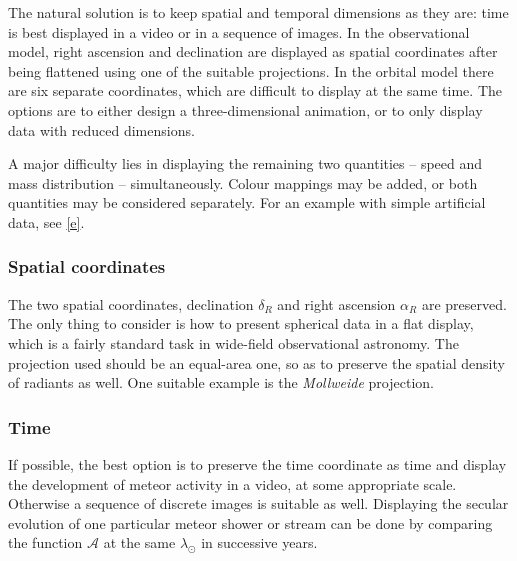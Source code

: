         The natural solution is to keep spatial and temporal dimensions as they are:
        time is best displayed in a video or in a sequence of images.
        In the observational model, right ascension and declination are displayed as spatial coordinates after being
        flattened using one of the suitable projections.
        In the orbital model there are six separate coordinates, which are difficult to display at the same time.
        The options are to either design a three-dimensional animation, or to only display data with reduced dimensions.

        A major difficulty lies in displaying the remaining two quantities -- speed and mass distribution -- simultaneously.
        Colour mappings may be added, or both quantities may be considered separately.
        For an example with simple artificial data, see \cref{e}.

        \subsubsection{Spatial coordinates} \label{iovs}
            The two spatial coordinates, declination $\delta_R$ and right ascension $\alpha_R$ are preserved.
            The only thing to consider is how to present spherical data in a flat display,
            which is a fairly standard task in wide-field observational astronomy.
            The projection used should be an equal-area one, so as to preserve the spatial density of radiants as well.
            One suitable example is the \emph{Mollweide} projection.


        \subsubsection{Time} \label{iovt}
            If possible, the best option is to preserve the time coordinate as time
            and display the development of meteor activity in a video, at some appropriate scale.
            Otherwise a sequence of discrete images is suitable as well.
            Displaying the secular evolution of one particular meteor shower or stream can be done
            by comparing the function $\mathcal{A}$ at the same $\lambda_\odot$ in successive years.

